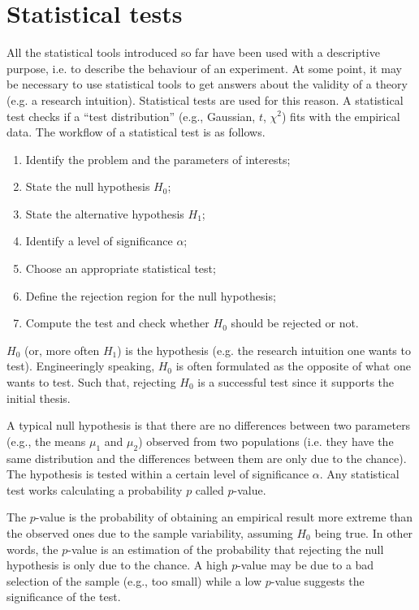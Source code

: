 \section{Statistical tests} \label{secStatTest}

All the statistical tools introduced so far have been used with a descriptive purpose, i.e. to describe the behaviour of an experiment. At some point, it may be necessary to use statistical tools to get answers about the validity of a theory (e.g. a research intuition). Statistical tests are used for this reason. A statistical test checks if a “test distribution” (e.g., Gaussian, $t$, $\chi^2$) fits with the empirical data. The workflow of a statistical test is as follows.
\begin{enumerate}
    \item Identify the problem and the parameters of interests;
    \item State the null hypothesis $H_0$;
    \item State the alternative hypothesis $H_1$;
    \item Identify a level of significance $\alpha$;
    \item Choose an appropriate statistical test;
    \item Define the rejection region for the null hypothesis;
    \item Compute the test and check whether $H_0$ should be rejected or not.
\end{enumerate}

$H_0$ (or, more often $H_1$) is the hypothesis (e.g. the research intuition one wants to test). Engineeringly speaking, $H_0$ is often formulated as the opposite of what one wants to test. Such that, rejecting $H_0$ is a successful test since it supports the initial thesis.\par

A typical null hypothesis is that there are no differences between two parameters (e.g., the means $\mu_1$ and $\mu_2$) observed from two populations (i.e. they have the same distribution and the differences between them are only due to the chance). The hypothesis is tested within a certain level of significance $\alpha$. Any statistical test works calculating a probability $p$ called $p$-value.\par

The $p$-value is the probability of obtaining an empirical result more extreme than the observed ones due to the sample variability, assuming $H_0$ being true. In other words, the $p$-value is an estimation of the probability that rejecting the null hypothesis is only due to the chance. A high $p$-value may be due to a bad selection of the sample (e.g., too small) while a low $p$-value suggests the significance of the test.\par

